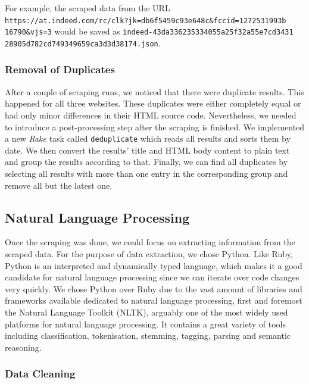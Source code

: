 \documentclass[runningheads]{llncs}
\begin{document}
For example, the scraped data from the URL \\
\texttt{https://at.indeed.com/rc/clk?jk=db6f5459c93e648c\&fccid=1272531993b\\16790\&vjs=3} would be saved as
\texttt{indeed-43da336235334055a25f32a55e7cd3431\\28905d782cd749349659ca3d3d38174.json}.

\subsubsection{Removal of Duplicates}
\label{subsub:removal_of_duplicates}

After a couple of scraping runs, we noticed that there were duplicate results. This happened for all three websites. These duplicates were either completely equal or had only minor differences in their HTML source code. Nevertheless, we needed to introduce a post-processing step after the scraping is finished. We implemented a new \textit{Rake} task called \texttt{deduplicate} which reads all results and sorts them by date. We then convert the results' title and HTML body content to plain text and group the results according to that. Finally, we can find all duplicates by selecting all results with more than one entry in the corresponding group and remove all but the latest one.

\subsection{Natural Language Processing}
\label{sub:natural_language_processing}

Once the scraping was done, we could focus on extracting information from the scraped data. For the purpose of data extraction, we chose Python. Like Ruby, Python is an interpreted and dynamically typed language, which makes it a good candidate for natural language processing since we can iterate over code changes very quickly. We chose Python over Ruby due to the vast amount of libraries and frameworks available dedicated to natural language processing, first and foremost the Natural Language Toolkit (NLTK), arguably one of the most widely used platforms for natural language processing. It contains a great variety of tools including classification, tokenisation, stemming, tagging, parsing and semantic reasoning. \cite{nltk}

\subsubsection{Data Cleaning}
\label{subsub:data_cleaning}
\end{document}

